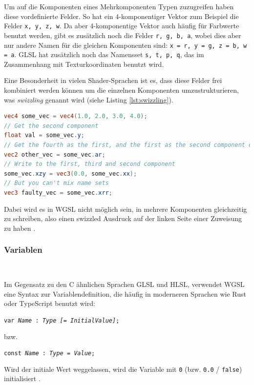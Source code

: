 \documentclass[oneside]{ausarbeitung}
\newcommand*{\quotize}[1]{\glqq #1\grqq}
\begin{document}
Um auf die Komponenten eines Mehrkomponenten Typen zuzugreifen haben diese vordefinierte Felder. So hat ein 4-komponentiger Vektor zum Beispiel die Felder \texttt{x, y, z, w}. Da aber 4-komponentige Vektor auch häufig für Farbwerte benutzt werden, gibt es zusätzlich noch die Felder \texttt{r, g, b, a}, wobei dies aber nur andere Namen für die gleichen Komponenten sind: \texttt{x = r, y = g, z = b, w = a}. GLSL hat zusätzlich noch das Namensset \texttt{s, t, p, q}, das im Zusammenhang mit Texturkoordinaten benutzt wird.

Eine Besonderheit in vielen Shader-Sprachen ist es, dass diese Felder frei kombiniert werden können um die einzelnen Komponenten umzustrukturieren, was \textit{swizzling} \cite{wikipedia:swizzling} genannt wird (siehe Listing \ref{lst:swizzling}).

\begin{minipage}{\textwidth}
\begin{lstlisting}[language=GLSL, label={lst:swizzling}, caption={\quotize{Swizzling} von Komponenten in GLSL}]
vec4 some_vec = vec4(1.0, 2.0, 3.0, 4.0);
// Get the second component
float val = some_vec.y;
// Get the fourth as the first, and the first as the second component of a new vec2
vec2 other_vec = some_vec.ar; 
// Write to the first, third and second component
some_vec.xzy = vec3(0.0, some_vec.xx);
// But you can't mix name sets
vec3 faulty_vec = some_vec.xrr;
\end{lstlisting}
\end{minipage}

Dabei wird es in WGSL nicht möglich sein, in mehrere Komponenten gleichzeitig zu schreiben, also einen \quotize{swizzled} Ausdruck auf der linken Seite einer Zuweisung zu haben \cite[Vgl.][Typed Storage]{w3:wgsl}.

\subsubsection{Variablen} \

Im Gegensatz zu den C ähnlichen Sprachen GLSL und HLSL, verwendet WGSL eine Syntax zur Variablendefinition, die häufig in \quotize{moderneren} Sprachen wie Rust oder TypeScript benutzt wird:

\texttt{var \textit{Name} : \textit{Type} \textit{[= InitialValue]};} 

bzw. 

\texttt{const \textit{Name} : \textit{Type} = \textit{Value};}

Wird der initiale Wert weggelassen, wird die Variable mit  \texttt{0} (bzw. \texttt{0.0} / \texttt{false}) initialisiert \cite[Vgl.][Zero values]{w3:wgsl}.
\end{document}
